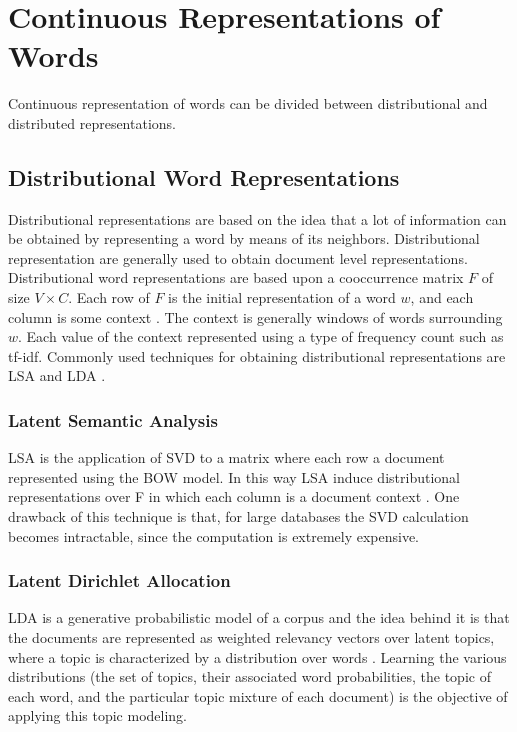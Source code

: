  \section{Continuous Representations of Words}

\label{sec:sub_continuous_representation}
 Continuous representation  of words  can be divided between distributional and
 distributed representations. 

\subsection{Distributional Word Representations}

Distributional representations are based on the idea that a lot of
information can be obtained by representing a word by means of its neighbors.
Distributional representation are generally used to obtain document level representations.
Distributional word representations are based upon a cooccurrence matrix $F$
of size $V \times C$.  Each row of $F$ is the 
initial representation of a word $w$, and each column is some context
\cite{Turian:2010:WRS:1858681.1858721}. The context is  generally windows of
 words surrounding $w$. Each value of the context  represented using a type of
frequency count such as \ac{tf-idf}. Commonly used techniques for obtaining distributional
representations  are \ac{LSA} \cite{Dumais:1988:ULS:57167.57214} and \ac{LDA}
\cite{Blei:2003:LDA:944919.944937}.


 \subsubsection{Latent Semantic Analysis}
 \label{sec:rel_sa}
\ac{LSA} is the application of \ac{SVD} to a matrix where each row a document
represented using the \ac{BOW} model. In this way
 \ac{LSA} induce   distributional representations over F in which
each column is a document context \cite{Turian:2010:WRS:1858681.1858721}.  
One drawback of this technique is that,  for large databases the SVD
calculation becomes intractable, since the computation is extremely
expensive.

 \subsubsection{Latent Dirichlet Allocation}
 \label{sec:rel_lda}
\ac{LDA} is a generative probabilistic model of a corpus and the
idea behind it is that the documents are represented as weighted relevancy
vectors over latent topics, where a topic is characterized by a distribution over
words \cite{Blei:2003:LDA:944919.944937}.
Learning the various distributions (the set of topics, their associated word
probabilities, the topic of each word, and the particular topic mixture of
each document) is the objective of applying this topic modeling.

